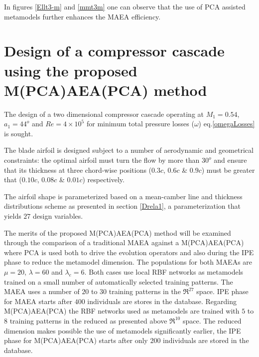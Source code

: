 In figures \ref{Ellt3-m} and \ref{mmt3m} one can observe that the use of PCA assisted metamodels further enhances the MAEA efficiency.


\section{Design of a compressor cascade using the proposed M(PCA)AEA(PCA) method}


The design of a two dimensional compressor cascade operating at $M_1=0.54$, $a_1=44^o$ and $Re=4\times10^5$ for minimum total pressure losses ($\omega$) eq.\ref{omegaLosses} is sought. 

The blade airfoil is designed subject to a number of aerodynamic and geometrical constraints: the optimal airfoil must turn the flow by more than $30^o$ and ensure that its thickness at three chord-wise positions ($0.3c$, $0.6c$ \& $0.9c$) must be greater that ($0.10c$, $0.08c$ \& $0.01c$)  respectively.     

The airfoil shape is parameterized based on a mean-camber line and thickness distributions scheme as presented in section \ref{Drela1}, a parameterization that yields $27$ design variables.

The merits of the proposed M(PCA)AEA(PCA) method will be examined through the comparison of a traditional MAEA against a M(PCA)AEA(PCA) where PCA is used both to drive the evolution operators and also during the IPE phase to reduce the metamodel dimension. The populations for both MAEAs are $\mu=20$, $\lambda=60$ and $\lambda_e=6$. Both cases use local RBF networks as metamodels trained on a small number of automatically selected training patterns. The MAEA uses a number of  $20$ to $30$ training patterns in the $\Re^{27}$ space. IPE phase for MAEA starts after $400$ individuals are stores in the database. Regarding M(PCA)AEA(PCA) the RBF networks used as metamodels are trained with $5$ to $8$ training patterns in the reduced as presented above $\Re^{10}$ space. The reduced dimension makes possible the use of metamodels significantly earlier, the IPE phase for M(PCA)AEA(PCA) starts after only $200$ individuals are stored in the database. 


